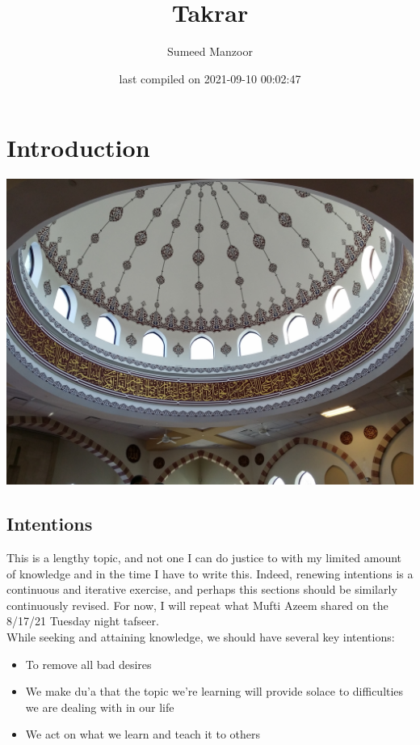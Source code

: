 \documentclass[]{book}
\title{Takrar}
\author{Sumeed Manzoor}
\date{last compiled on 2021-09-10 00:02:47}
\providecommand{\tightlist}{%
  \setlength{\itemsep}{0pt}\setlength{\parskip}{0pt}}
\begin{document}
\maketitle

{
\setcounter{tocdepth}{1}
\tableofcontents
}
\hypertarget{intro}{%
\chapter{Introduction}\label{intro}}

\includegraphics{images/ds2.jpg}

\hypertarget{intent}{%
\section{Intentions}\label{intent}}

This is a lengthy topic, and not one I can do justice to with my limited amount of knowledge and in the time I have to write this. Indeed, renewing intentions is a continuous and iterative exercise, and perhaps this sections should be similarly continuously revised. For now, I will repeat what Mufti Azeem shared on the 8/17/21 Tuesday night tafseer.\\
While seeking and attaining knowledge, we should have several key intentions:

\begin{itemize}
\tightlist
\item
  To remove all bad desires
\item
  We make du'a that the topic we're learning will provide solace to difficulties we are dealing with in our life
\item
  We act on what we learn and teach it to others
\end{itemize}
\end{document}
